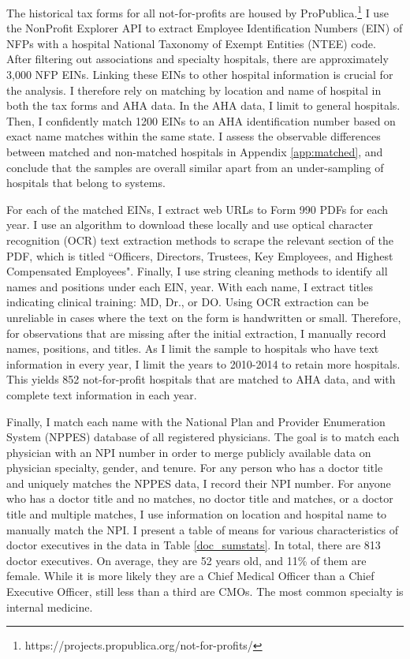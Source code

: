 \documentclass[12pt]{article}
\begin{document}
    The historical tax forms for all not-for-profits are housed by ProPublica.\footnote{https://projects.propublica.org/not-for-profits/} I use the NonProfit Explorer API to extract Employee Identification Numbers (EIN) of NFPs with a hospital National Taxonomy of Exempt Entities (NTEE) code. After filtering out associations and specialty hospitals, there are approximately 3,000 NFP EINs. Linking these EINs to other hospital information is crucial for the analysis. I therefore rely on matching by location and name of hospital in both the tax forms and AHA data. In the AHA data, I limit to general hospitals. Then, I confidently match 1200 EINs to an AHA identification number based on exact name matches within the same state. I assess the observable differences between matched and non-matched hospitals in Appendix \ref{app:matched}, and conclude that the samples are overall similar apart from an under-sampling of hospitals that belong to systems.
    
    For each of the matched EINs, I extract web URLs to Form 990 PDFs for each year. I use an algorithm to download these locally and use optical character recognition (OCR) text extraction methods to scrape the relevant section of the PDF, which is titled ``Officers, Directors, Trustees, Key Employees, and Highest Compensated Employees". Finally, I use string cleaning methods to identify all names and positions under each EIN, year. With each name, I extract titles indicating clinical training: MD, Dr., or DO. Using OCR extraction can be unreliable in cases where the text on the form is handwritten or small. Therefore, for observations that are missing after the initial extraction, I manually record names, positions, and titles. As I limit the sample to hospitals who have text information in every year, I limit the years to 2010-2014 to retain more hospitals. This yields 852 not-for-profit hospitals that are matched to AHA data, and with complete text information in each year. 

    Finally, I match each name with the National Plan and Provider Enumeration System (NPPES) database of all registered physicians. The goal is to match each physician with an NPI number in order to merge publicly available data on physician specialty, gender, and tenure. For any person who has a doctor title and uniquely matches the NPPES data, I record their NPI number. For anyone who has a doctor title and no matches, no doctor title and matches, or a doctor title and multiple matches, I use information on location and hospital name to manually match the NPI. I present a table of means for various characteristics of doctor executives in the data in Table \ref{doc_sumstats}. In total, there are 813 doctor executives. On average, they are 52 years old, and 11\% of them are female. While it is more likely they are a Chief Medical Officer than a Chief Executive Officer, still less than a third are CMOs. The most common specialty is internal medicine. 
\end{document}

